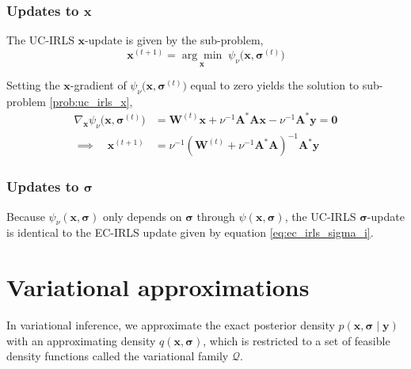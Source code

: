 \documentclass{article}
\newcommand{\m}[1]{\boldsymbol{#1}}
\begin{document}
\subsubsection{Updates to $\m{x}$}
The UC-IRLS $\m{x}$-update is given by the sub-problem,
\begin{equation}
\m{x}^{(t+1)} =
 \underset{\m{x}}{\arg\min} \;
 \psi_\nu\big( \m{x}, \m{\sigma}^{(t)} \big)
\label{prob:uc_irls_x}
\end{equation}

Setting the $\m{x}$-gradient of
$\psi_\nu\big( \m{x}, \m{\sigma}^{(t)} \big)$
equal to zero yields the solution to sub-problem \eqref{prob:uc_irls_x},
\begin{equation}
\begin{aligned}
\nabla_{\m{x}} \psi_\nu\big( \m{x}, \m{\sigma}^{(t)} \big) &=
 \m{W}^{(t)} \m{x} + \nu^{-1} \m{A}^* \m{A} \m{x} -
 \nu^{-1} \m{A}^* \m{y} = \m{0}
\\ \implies \quad
\m{x}^{(t+1)} &=
 \nu^{-1} \left(
  \m{W}^{(t)} + \nu^{-1} \m{A}^* \m{A}
 \right)^{-1} \m{A}^* \m{y}
\end{aligned}
\label{eq:uc_irls_x}
\end{equation}

\subsubsection{Updates to $\m{\sigma}$}
Because $\psi_\nu(\m{x}, \m{\sigma})$ only depends on $\m{\sigma}$ through
$\psi(\m{x}, \m{\sigma})$, the UC-IRLS $\m{\sigma}$-update is identical
to the EC-IRLS update given by equation \eqref{eq:ec_irls_sigma_i}.

\section{Variational approximations}
\label{s:var_approx}
In variational inference, we approximate the exact posterior density
$p(\m{x}, \m{\sigma} \mid \m{y})$ with an approximating density
$q(\m{x}, \m{\sigma})$, which is restricted to a set of feasible
density functions called the variational family $\mathcal{Q}$.
\end{document}
